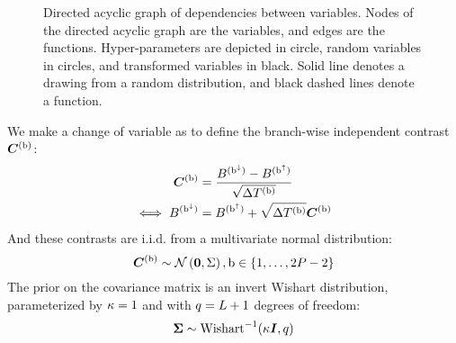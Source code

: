 \begin{figure}[H]
	\caption[Directed acyclic graph of dependencies between variables]{
	Directed acyclic graph of dependencies between variables.
	Nodes of the directed acyclic graph are the variables, and edges are the functions.
	Hyper-parameters are depicted in {\color{RED}{red}} circle, random variables in {\color{BLUE}{blue}} circles, and transformed variables in black.
	Solid {\color{BLUE}{blue}} line denotes a drawing from a random distribution, and black dashed lines denote a function.
}
	\label{fig:graph}%
\end{figure}

We make a change of variable as to define the branch-wise independent contrast $\bm{C}^{(\text{b})}$:
\begin{align}
\contrast\branchexp &= \dfrac{\brownian^{(\nodeDown)} - \brownian^{(\nodeUp)}}{\sqrt{\branchtime\branchexp}} \\
\label{eq:independent_contrast}
\iff \brownian^{(\nodeDown)} &= \brownian^{(\nodeUp)} + \sqrt{\branchtime\branchexp}\contrast\branchexp 
\end{align}
And these contrasts are i.i.d.
from a multivariate normal distribution:
\begin{equation}
\label{eq:Distribcontrast}
\contrast\branchexp \sim \mathcal{N}\left(\bm{0}, \Covariancematrix \right), \Setbranch
\end{equation}
The \gls{prior} on the covariance matrix is an invert Wishart distribution, parameterized by $\kappa=1$ and with $q=L + 1$ degrees of freedom:
\begin{equation}
\label{eq:Distribcovariance}
\CovarianceMatrix \sim \mathrm{Wishart}^{-1} (\covariancekappa \Identitymatrix, \covariancedf)
\end{equation}

